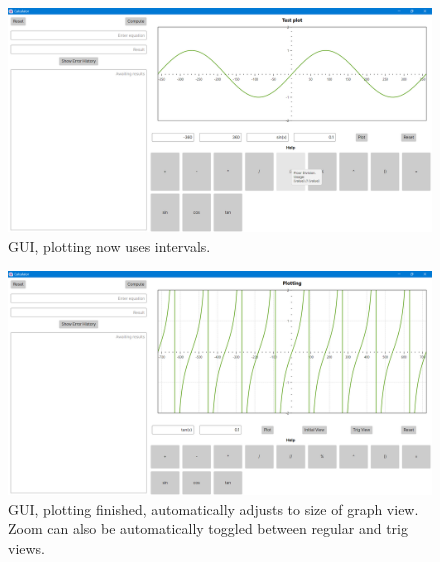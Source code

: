 \documentclass[a4paper, oneside, 11pt]{report}
\begin{document}
    \begin{figure}[htb]
        \begin{center}
            \includegraphics[width=0.9 \columnwidth]{gui_old_06.png}
            \caption{GUI, plotting now uses intervals.}
            \label{gui06}
        \end{center}
    \end{figure}

    \begin{figure}[htb]
        \begin{center}
            \includegraphics[width=0.9 \columnwidth]{gui_old_07.png}
            \caption{GUI, plotting finished, automatically adjusts to size of graph view. Zoom can also be automatically toggled between regular and trig views.}
            \label{gui07}
        \end{center}
    \end{figure}
\end{document}
